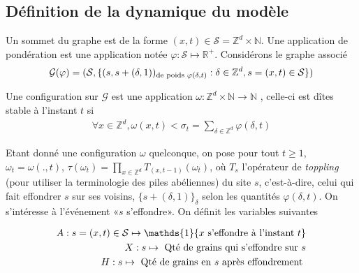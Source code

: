 \documentclass{article}
\theoremstyle{definition}
\begin{document}
\subsection{Définition de la dynamique du modèle}
Un sommet du graphe est de la forme $(x,t)\in \mathcal{S} = \mathbb{Z}^d\times \mathbb{N}$. Une application de pondération est une application notée $\varphi : \mathcal{S}\mapsto \mathbb{R}^+$. Considérons le graphe associé 
\begin{align*}
	\mathcal{G}(\varphi) = (\mathcal{S}, \{(s,s+(\delta,1))_{\textup{de poids } \varphi(\delta,t)} : \delta\in \mathbb{Z}^d, s=(x,t)\in \mathcal{S}\})
\end{align*}

Une configuration sur $\mathcal{G}$ est une application $\omega : \mathbb{Z}^d\times\mathbb{N}\to \mathbb{N}$ , celle-ci est dîtes stable à l'instant $t$ si
\begin{align*}
	\forall x\in\mathbb{Z}^d, \omega(x,t)<\sigma_t = \sum_{\delta\in \mathbb{Z}^d}\varphi(\delta,t)
\end{align*}

Etant donné une configuration $\omega$ quelconque, on pose pour tout $t\geq 1$, $\omega_t = \omega(.,t)$, $\tau(\omega_t) = \prod_{x\in \mathbb{Z}^d} T_{(x,t-1)} (\omega_t)$, où $T_s$ l'opérateur de \textit{toppling} (pour utiliser la terminologie des piles abéliennes) du site $s$, c'est-à-dire, celui qui fait effondrer $s$ sur ses voisins, $\{s+(\delta, 1)\}_{\delta}$ selon les quantités $\varphi(\delta,t)$. On s'intéresse à l'événement «$s$ s'effondre». On définit les variables suivantes

\begin{align*}
	A : s = (x,t)\in\mathcal{S} \mapsto \mathds{1}\{x\textup{ s'effondre à l'instant } t\}\\
	X : s \mapsto \textup{ Qté de grains qui s'effondre sur } s\\
	H : s \mapsto \textup{ Qté de grains en } s \textup{ après effondrement }
\end{align*}
\end{document}
